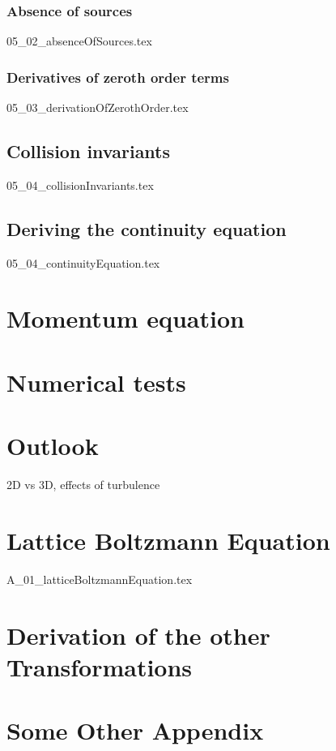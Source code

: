 \documentclass[12pt,a4paper,twoside]{article}
\begin{document}
\subsubsection{Absence of sources}
\label{subs: Absence of sources}
{05_02_absenceOfSources.tex}

\subsubsection{Derivatives of zeroth order terms}
\label{subs: Derivatives of zeroth order terms}
{05_03_derivationOfZerothOrder.tex}

\subsection{Collision invariants}
\label{sub: Collision invariants}
{05_04_collisionInvariants.tex}

\subsection{Deriving the continuity equation}
\label{sub: Deriving the continuity equation}
{05_04_continuityEquation.tex}

\section{Momentum equation}
\label{sec: Momentum equation}

\section{Numerical tests}
\label{sec: Numerics}

\section{Outlook}
\label{sec: Outlook}
2D vs 3D, effects of turbulence

\newpage
\begin{appendices}

\section{Lattice Boltzmann Equation}
\label{sec: Lattice Boltzmann Equation}
{A_01_latticeBoltzmannEquation.tex}

\section{Derivation of the other Transformations}
\section{Some Other Appendix}

\end{appendices}




\end{document}
